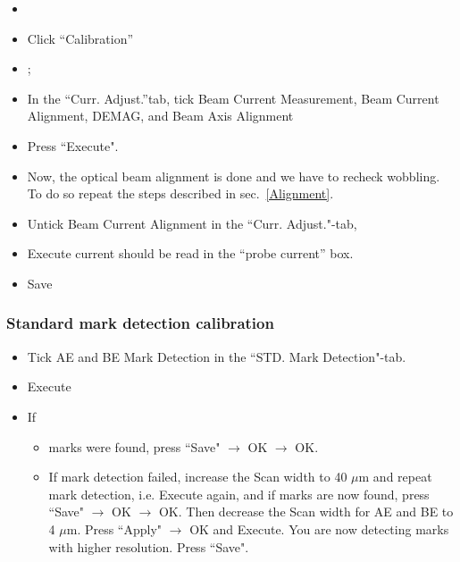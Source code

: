 \begin{itemize}
\item {}
\item Click ``Calibration''
\item {};
\item In  the ``Curr.   Adjust.''tab, tick Beam  Current Measurement,
  Beam Current Alignment, DEMAG, and Beam Axis
  Alignment %
\item Press ``Execute".
\item Now, the optical beam alignment  is done and we have to recheck
  wobbling.    To    do   so   repeat   the    steps   described   in
  sec.~\ref{Alignment}.
\end{itemize}

\begin{itemize}
\item Untick Beam Current Alignment in the ``Curr. Adjust."-tab,
\item Execute  \ira current should  be read in the  ``probe current''
  box.
\item Save
\end{itemize}

\subsubsection{Standard mark detection calibration}
\label{sec:stand-mark-detect}

\begin{itemize}
\item  Tick   AE  and   BE  Mark  Detection   in  the   ``STD.   Mark
  Detection"-tab.
\item Execute
\item If
  \begin{itemize} \item marks were found, press ``Save" $\rightarrow$
    OK $\rightarrow$ OK.
  \item  If mark  detection failed,  increase  the Scan  width to  40
    $\mu$m and  repeat mark  detection, i.e.   Execute again,  and if
    marks are now found, press ``Save" $\rightarrow$ OK $\rightarrow$
    OK.  Then  decrease the  Scan width  for AE and  BE to  4 $\mu$m.
    Press  ``Apply"  $\rightarrow$  OK  and  Execute.   You  are  now
    detecting marks with higher resolution. Press ``Save".
  \end{itemize}
\end{itemize}

